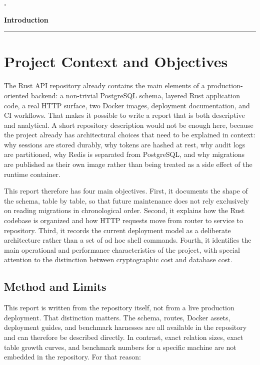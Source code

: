 \documentclass[11pt,a4paper]{article}
\newcommand{\reportpart}[1]{%
  \clearpage
  \refstepcounter{part}%
  \addcontentsline{toc}{part}{\thepart.\enspace #1}%
  \thispagestyle{plain}%
  \begin{center}
    \vspace*{2.0cm}
    {\Huge\bfseries \thepart.\par}
    \vspace{0.35cm}
    {\huge\bfseries #1\par}
    \vspace{0.45cm}
    \rule{0.42\linewidth}{0.7pt}\par
    \vspace{0.8cm}
  \end{center}
}
\begin{document}
\newpage

\clearpage
\thispagestyle{empty}
\tableofcontents
\vspace*{\fill}
\clearpage

\clearpage
{}
\hypersetup{pageanchor=true}

\reportpart{Introduction}

\section{Project Context and Objectives}

The Rust API repository already contains the main elements of a production-oriented backend: a non-trivial PostgreSQL schema, layered Rust application code, a real HTTP surface, two Docker images, deployment documentation, and CI workflows. That makes it possible to write a report that is both descriptive and analytical. A short repository description would not be enough here, because the project already has architectural choices that need to be explained in context: why sessions are stored durably, why tokens are hashed at rest, why audit logs are partitioned, why Redis is separated from PostgreSQL, and why migrations are published as their own image rather than being treated as a side effect of the runtime container.

This report therefore has four main objectives. First, it documents the shape of the schema, table by table, so that future maintenance does not rely exclusively on reading migrations in chronological order. Second, it explains how the Rust codebase is organized and how HTTP requests move from router to service to repository. Third, it records the current deployment model as a deliberate architecture rather than a set of ad hoc shell commands. Fourth, it identifies the main operational and performance characteristics of the project, with special attention to the distinction between cryptographic cost and database cost.

\subsection{Method and Limits}

This report is written from the repository itself, not from a live production deployment. That distinction matters. The schema, routes, Docker assets, deployment guides, and benchmark harnesses are all available in the repository and can therefore be described directly. In contrast, exact relation sizes, exact table growth curves, and benchmark numbers for a specific machine are not embedded in the repository. For that reason:
\end{document}

